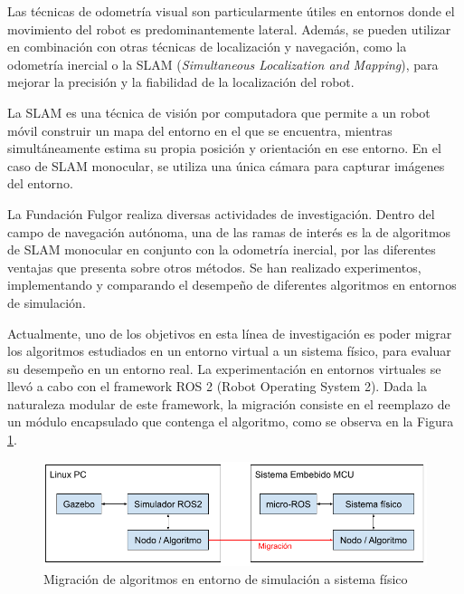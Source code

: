 \documentclass[
11pt, %
codirector, %
]{charter}
\begin{document}
Las técnicas de odometría visual son particularmente útiles en entornos donde el movimiento del robot es predominantemente lateral. Además, se pueden utilizar en combinación con otras técnicas de localización y navegación, como la odometría inercial o la SLAM (\textit{Simultaneous Localization and Mapping}), para mejorar la precisión y la fiabilidad de la localización del robot.

La SLAM es una técnica de visión por computadora que permite a un robot móvil construir un mapa del entorno en el que se encuentra, mientras simultáneamente estima su propia posición y orientación en ese entorno. En el caso de SLAM monocular, se utiliza una única cámara para capturar imágenes del entorno.

La Fundación Fulgor realiza diversas actividades de investigación. Dentro del campo de navegación autónoma, una de las ramas de interés es la de algoritmos de SLAM monocular en conjunto con la odometría inercial, por las diferentes ventajas que presenta sobre otros métodos. Se han realizado experimentos, implementando y comparando el desempeño de diferentes algoritmos en entornos de simulación.

Actualmente, uno de los objetivos en esta línea de investigación es poder migrar los algoritmos estudiados en un entorno virtual a un sistema físico, para evaluar su desempeño en un entorno real. La experimentación en entornos virtuales se llevó a cabo con el framework ROS 2 (Robot Operating System 2).
Dada la naturaleza modular de este framework, la migración consiste en el reemplazo de un módulo encapsulado que contenga el algoritmo, como se observa en la Figura \ref{fig:ros2-to-microros}. 

\begin{figure}[htpb]
\centering 
\includegraphics[width=.8\textwidth]{./Figuras/ros2-microros-migration.png}
\caption{Migración de algoritmos en entorno de simulación a sistema físico}
\label{fig:ros2-to-microros}
\end{figure}

\end{document}
